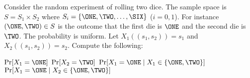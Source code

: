   Consider the random experiment of rolling two dice.
  The sample space is $S = S_1 \times S_2$ where
  $S_i = \{\ONE, \TWO, \ldots, \SIX \}$ ($i = 0, 1$).
For instance $(\ONE, \TWO) \in S$ is the outcome that the first
die is $\ONE$ and the second die is $\TWO$.
The probability is uniform.
Let $X_1((s_1, s_2)) = s_1$ and $X_2((s_1, s_2)) = s_2$.
Compute the following:
\begin{itemize}
  \li $\Pr[X_1=\ONE]$
  \li $\Pr[X_2=\TWO]$
  \li $\Pr[X_1 = \ONE \mid X_1 \in \{ \ONE, \TWO \}]$
  \li $\Pr[X_1 = \ONE \mid X_2 \in \{ \ONE, \TWO \}]$
\end{itemize}
